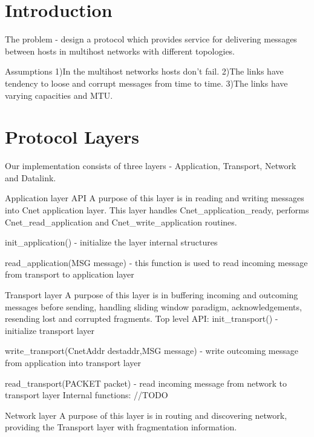 \documentclass{article}
\begin{document}
\title{}
\author{Group 7: \\ Sanjar Karaev, Igor Stassiy, Kirill Afanasev}
\date{\today}
\maketitle

\section{Introduction}
	The problem - design a protocol which provides service for delivering messages
	between hosts in multihost networks with different topologies. 
	
	Assumptions
		1)In the multihost networks hosts don't fail.
		2)The links have tendency to loose and corrupt messages from time to time.
		3)The links have varying capacities and MTU.
\section{Protocol Layers}
Our implementation consists of three layers - Application, Transport, Network
and Datalink. 

	Application layer API
		A purpose of this layer is in reading and writing messages into Cnet
		application layer. This layer handles Cnet_application_ready, performs
		Cnet_read_application and Cnet_write_application routines.
	
		init_application() - initialize the layer internal structures
		
		read_application(MSG message) - this function is used to read incoming message
		from transport to application layer
		
		
		
	Transport layer
		A purpose of this layer is in buffering incoming and outcoming messages
		before sending, handling sliding window paradigm, acknowledgements, resending
		lost and corrupted fragments.
		Top level API:
			init_transport() - initialize transport layer
		
			write_transport(CnetAddr destaddr,MSG message) - write outcoming message from
			application into transport layer
		
			read_transport(PACKET packet) - read incoming message from network to
			transport layer
		Internal functions:
			//TODO
		
		
	Network layer
		A purpose of this layer is in routing and discovering network, providing the
		Transport layer with fragmentation information.
		
\end{document}
